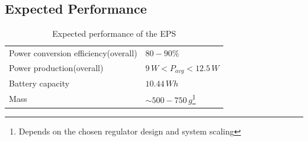 \subsection{Expected Performance}
%
\begin{table}[H]
\centering
\caption{Expected performance of the \ac{EPS}}
\label{tab:expected_performance}
\begin{minipage}{\textwidth}
\begin{tabular}{p{}p{}}
\hline
Power conversion efficiency(overall) & $80-90\%$\\
Power production(overall) & $9\,W < P_{avg} < 12.5\,W$\\
Battery capacity & $10.44\,Wh$\\
Mass & $\sim500-750\,g$\footnote{Depends on the chosen regulator design and system scaling}\\
\hline
\end{tabular}\par
\vspace{-0.75\skip\footins}
\renewcommand{\footnoterule}{}
\end{minipage}
\end{table}